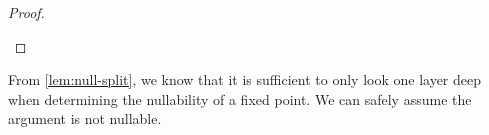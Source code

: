 \begin{proof}
\begin{code}%
%
\>[4]\AgdaSpace{}%
\AgdaSymbol{\{}\AgdaSymbol{\}}\AgdaSpace{}%
\AgdaSymbol{=}\AgdaSpace{}%
\AgdaSpace{}%
\AgdaSymbol{(}\AgdaSpace{}%
\AgdaSpace{}%
\AgdaSpace{}%
\AgdaSymbol{)}\AgdaSpace{}%
\AgdaSymbol{(}\AgdaSpace{}%
\AgdaSpace{}%
\AgdaSpace{}%
\AgdaSymbol{\{}\AgdaSpace{}%
\AgdaSymbol{=}\AgdaSpace{}%
\AgdaSymbol{\}}\AgdaSpace{}%
\AgdaSpace{}%
\AgdaSpace{}%
\AgdaSymbol{)}\<%
\end{code}
\end{proof}

From \cref{lem:null-split}, we know that it is sufficient to only look one layer deep when determining the nullability of a fixed point. We can safely assume the argument is not nullable. 
%
\begin{code}%
%
\>[4]\AgdaSpace{}%
\AgdaSymbol{=}\AgdaSpace{}%
\AgdaSpace{}%
\AgdaSpace{}%
\AgdaSpace{}%
\AgdaSpace{}%
\AgdaSymbol{(}\AgdaSpace{}%
\AgdaSpace{}%
\AgdaSymbol{())}\<%
\end{code}


